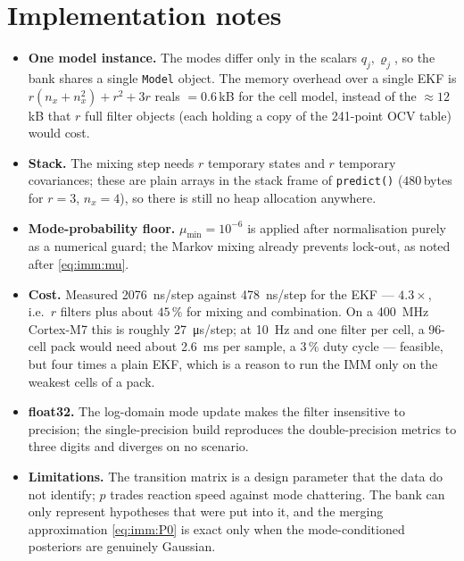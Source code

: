 \section{Implementation notes}
\begin{itemize}[leftmargin=1.4em]
\item \textbf{One model instance.}  The modes differ only in the scalars $q_j,\varrho_j$, so the bank
      shares a single \texttt{Model} object.  The memory overhead over a single EKF is
      $r(n_x+n_x^2)+r^2+3r$ reals $=0.6$\,kB for the cell model, instead of the
      $\approx 12$\,kB that $r$ full filter objects (each holding a copy of the
      241-point OCV table) would cost.
\item \textbf{Stack.}  The mixing step needs $r$ temporary states and $r$ temporary covariances;
      these are plain arrays in the stack frame of \texttt{predict()} ($480$\,bytes for
      $r=3$, $n_x=4$), so there is still no heap allocation anywhere.
\item \textbf{Mode-probability floor.}  $\mu_{\min}=10^{-6}$ is applied after normalisation purely as
      a numerical guard; the Markov mixing already prevents lock-out, as noted after
      \eqref{eq:imm:mu}.
\item \textbf{Cost.}  Measured \SI{2076}{\nano\second}/step against \SI{478}{\nano\second}/step for
      the EKF --- $4.3\times$, i.e.\ $r$ filters plus about $45\,\%$ for mixing and combination.  On a
      \SI{400}{\mega\hertz} Cortex-M7 this is roughly \SI{27}{\micro\second}/step; at \SI{10}{\hertz}
      and one filter per cell, a 96-cell pack would need about \SI{2.6}{\milli\second} per sample, a
      $3\,\%$ duty cycle --- feasible, but four times a plain EKF, which is a reason to run the IMM
      only on the weakest cells of a pack.
\item \textbf{float32.}  The log-domain mode update makes the filter insensitive to precision; the
      single-precision build reproduces the double-precision metrics to three digits and diverges on
      no scenario.
\item \textbf{Limitations.}  The transition matrix is a design parameter that the data do not
      identify; $p$ trades reaction speed against mode chattering.  The bank can only represent
      hypotheses that were put into it, and the merging approximation \eqref{eq:imm:P0} is exact only
      when the mode-conditioned posteriors are genuinely Gaussian.
\end{itemize}

